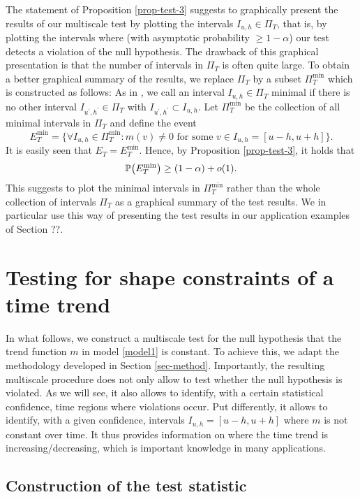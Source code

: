 \documentclass[a4paper,12pt]{article}
\numberwithin{equation}{section}
\begin{document}
The statement of Proposition \ref{prop-test-3} suggests to graphically present the results of our multiscale test by plotting the intervals $I_{u,h} \in \Pi_T$, that is, by plotting the intervals where (with asymptotic probability $\ge 1-\alpha$) our test detects a violation of the null hypothesis. The drawback of this graphical presentation is that the number of intervals in $\Pi_T$ is often quite large. To obtain a better graphical summary of the results, we replace $\Pi_T$ by a subset $\Pi_T^{\min}$ which is constructed as follows: As in \cite{Duembgen2002}, we call an interval $I_{u,h} \in \Pi_T$ minimal if there is no other interval $I_{u^\prime,h^\prime} \in \Pi_T$ with $I_{u^\prime,h^\prime} \subset I_{u,h}$. Let $\Pi_T^{\min}$ be the collection of all minimal intervals in $\Pi_T$ and define the event 
\[ E_T^{\min} = \Big\{ \forall I_{u,h} \in \Pi_T^{\min}: m(v) \ne 0 \text{ for some } v \in I_{u,h} = [u-h,u+h] \Big\}. \]
It is easily seen that $E_T = E_T^{\min}$. Hence, by Proposition \ref{prop-test-3}, it holds that
\[ \mathbb{P} \big( E_T^{\min} \big) \ge (1-\alpha) + o(1). \] 
This suggests to plot the minimal intervals in $\Pi_T^{\min}$ rather than the whole collection of intervals $\Pi_T$ as a graphical summary of the test results. We in particular use this way of presenting the test results in our application examples of Section ??. 



\section{Testing for shape constraints of a time trend}\label{sec-test-shape}


In what follows, we construct a multiscale test for the null hypothesis that the trend function $m$ in model \eqref{model1} is constant. To achieve this, we adapt the methodology developed in Section \ref{sec-method}. Importantly, the resulting multiscale procedure does not only allow to test whether the null hypothesis is violated. As we will see, it also allows to identify, with a certain statistical confidence, time regions where violations occur. Put differently, it allows to identify, with a given confidence, intervals $I_{u,h} = [u-h,u+h]$ where $m$ is not constant over time.
It thus provides information on where the time trend is increasing/decreasing, which is important knowledge in many applications. 


\subsection{Construction of the test statistic}\label{subsec-test-shape-stat}
\end{document}
